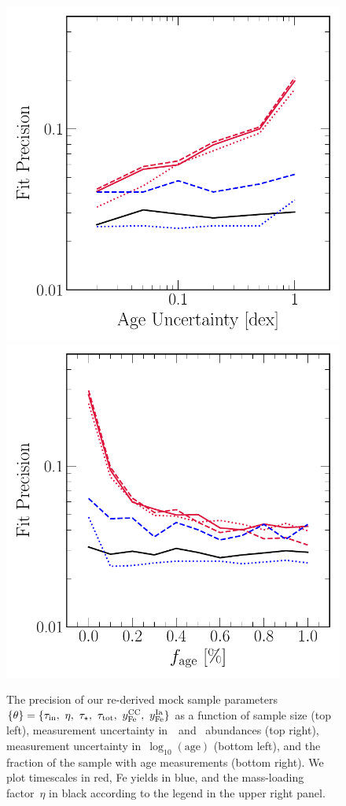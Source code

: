 \documentclass[ms.tex]{subfiles}
\begin{document}
\begin{itemize}
\begin{figure}
\includegraphics[scale = 0.52]{precision_ageuncertainty.pdf}
\includegraphics[scale = 0.52]{precision_agefrac.pdf}
\caption{
The precision of our re-derived mock sample parameters~$\{\theta\} =
\{\tau_\text{in},~\eta,~\tau_\star,~\tau_\text{tot},~y_\text{Fe}^\text{CC},~y_\text{Fe}^\text{Ia}\}$ as a
function of sample size (top left), measurement uncertainty in~\feh~and~\afe
abundances (top right), measurement uncertainty in~$\log_{10}(\text{age})$
(bottom left), and the fraction of the sample with age measurements (bottom
right).
We plot timescales in red, Fe yields in blue, and the mass-loading factor~$\eta$
in black according to the legend in the upper right panel.
}
\label{fig:precision}
\end{figure}


\end{itemize}
\end{document}
